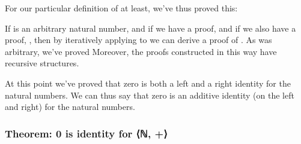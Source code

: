 \documentclass[letterpaper,10pt,english]{sphinxmanual}
\begin{document}
\sphinxAtStartPar
For our particular definition of  at least, we’ve thus proved this:

\begin{sphinxVerbatim}[commandchars=\\\{\}]
   
    
             
   
\end{sphinxVerbatim}

\sphinxAtStartPar
If  is an arbitrary natural number, and if we have a
proof,  and if we also have a proof, , then by iteratively applying
 to  we can derive a proof of . As 
was arbitrary, we’ve proved  Moreover, the proofs
constructed in this way have recursive structures.

\sphinxAtStartPar
At this point we’ve proved that zero is both a left and a
right identity for the natural numbers. We can thus say that
zero is an additive identity (on the left and right) for the
natural numbers.


\subsubsection{Theorem: 0 is identity for ⟨ℕ, +⟩}
\label{\detokenize{A_03_Recursive_Types:theorem-0-is-identity-for}}
\begin{sphinxVerbatim}[commandchars=\\\{\}]
 
 

  
     
         
         
 
  
  
\end{sphinxVerbatim}
\end{document}
